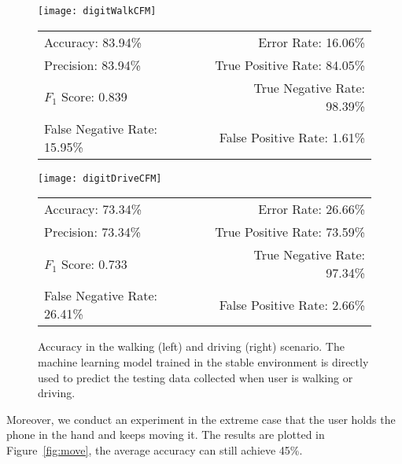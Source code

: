 \begin{landscape}
	\begin{figure}[!h]
		\centering
		\begin{minipage}[c]{.48\linewidth}
			\centering
			\texttt{[image: digitWalkCFM]}
			\begin{tabular}{lr}
				\toprule
				Accuracy: 83.94\% & \hspace{-.00in} Error Rate: 16.06\% \\
				Precision: 83.94\% & \hspace{-.00in} True Positive Rate: 84.05\% \\
				$F_1$ Score: 0.839 & \hspace{-.00in} True Negative Rate: 98.39\% \\
				False Negative Rate: 15.95\% & \hspace{-.00in} False Positive Rate: 1.61\% \\
				\bottomrule
			\end{tabular}
		\end{minipage}
		\begin{minipage}[c]{.48\linewidth}
			\centering
			\texttt{[image: digitDriveCFM]}
			\begin{tabular}{lr}
				\toprule
				Accuracy: 73.34\% & \hspace{-.00in} Error Rate: 26.66\% \\
				Precision: 73.34\% & \hspace{-.00in} True Positive Rate: 73.59\% \\
				$F_1$ Score: 0.733 & \hspace{-.00in} True Negative Rate: 97.34\% \\
				False Negative Rate: 26.41\% & \hspace{-.00in} False Positive Rate: 2.66\% \\
				\bottomrule
			\end{tabular}
		\end{minipage}
		\caption[Accuracy in the walking (left) and driving (right) scenario.]{Accuracy in the walking (left) and driving (right) scenario. The machine learning model trained in the stable environment is directly used to predict the testing data collected when user is walking or driving.}
		\label{fig: walkanddrive}
	\end{figure}
\end{landscape}



Moreover, we conduct an experiment in the extreme case that the user holds the phone in the hand and keeps moving it. The results are plotted in Figure~\ref{fig:move}, the average accuracy can still achieve 45\%.